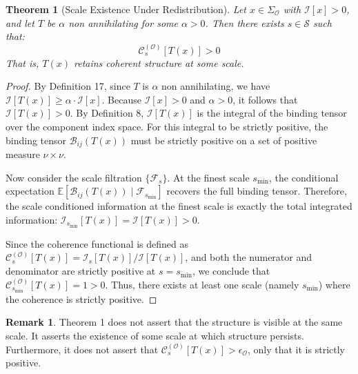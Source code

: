 \documentclass[12pt]{article}
\newtheorem{theorem}{Theorem}
\theoremstyle{definition}
\newtheorem{remark}{Remark}
\begin{document}
\begin{theorem}[Scale Existence Under Redistribution]
Let $x \in \Sigma_{\mathcal{O}}$ with $\mathcal{I}[x] > 0$, and let $T$ be $\alpha$ non annihilating for some $\alpha > 0$. Then there exists $s \in \mathcal{S}$ such that:
\begin{equation}
\mathcal{C}_s^{(\mathcal{O})}[T(x)] > 0
\end{equation}
That is, $T(x)$ retains coherent structure at some scale.
\end{theorem}
\begin{proof}
By Definition 17, since $T$ is $\alpha$ non annihilating, we have $\mathcal{I}[T(x)] \geq \alpha \cdot \mathcal{I}[x]$. Because $\mathcal{I}[x] > 0$ and $\alpha > 0$, it follows that $\mathcal{I}[T(x)] > 0$. By Definition 8, $\mathcal{I}[T(x)]$ is the integral of the binding tensor over the component index space. For this integral to be strictly positive, the binding tensor $\mathcal{B}_{ij}(T(x))$ must be strictly positive on a set of positive measure $\nu \times \nu$. 

Now consider the scale filtration $\{\mathcal{F}_s\}$. At the finest scale $s_{\min}$, the conditional expectation $\mathbb{E}[\mathcal{B}_{ij}(T(x)) \mid \mathcal{F}_{s_{\min}}]$ recovers the full binding tensor. Therefore, the scale conditioned information at the finest scale is exactly the total integrated information: $\mathcal{I}_{s_{\min}}[T(x)] = \mathcal{I}[T(x)] > 0$. 

Since the coherence functional is defined as $\mathcal{C}_s^{(\mathcal{O})}[T(x)] = \mathcal{I}_s[T(x)] / \mathcal{I}[T(x)]$, and both the numerator and denominator are strictly positive at $s = s_{\min}$, we conclude that $\mathcal{C}_{s_{\min}}^{(\mathcal{O})}[T(x)] = 1 > 0$. Thus, there exists at least one scale (namely $s_{\min}$) where the coherence is strictly positive.
\end{proof}

\begin{remark}
Theorem 1 does not assert that the structure is visible at the same scale. It asserts the existence of some scale at which structure persists. Furthermore, it does not assert that $\mathcal{C}_s^{(\mathcal{O})}[T(x)] > \epsilon_{\mathcal{O}}$, only that it is strictly positive.
\end{remark}
\end{document}
